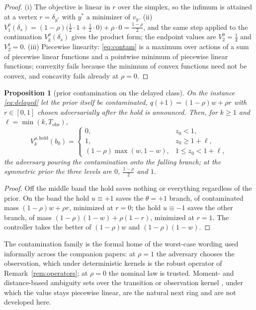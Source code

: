 \documentclass[11pt,a4paper]{article}
\theoremstyle{plain}
\newtheorem{proposition}[theorem]{Proposition}
\theoremstyle{definition}
\theoremstyle{remark}
\newcommand{\hold}{\mathrm{hold}}
\newcommand{\Tobs}{T_{\mathrm{obs}}}
\newcommand{\tfr}[2]{\tfrac{#1}{#2}}
\begin{document}
\begin{proof}
(i) The objective is linear in $r$ over the simplex, so the infimum is attained at a vertex $r=\delta_{y^{*}}$ with $y^{*}$ a minimizer of $v_y$. (ii) $V^{\rho}_1(\delta_s)=(1-\rho)\bigl(\tfr12\cdot1+\tfr12\cdot0\bigr)+\rho\cdot0=\tfr{1-\rho}2$, and the same step applied to the continuation $V^{\rho}_{k}(\delta_s)$ gives the product form; the endpoint values are $V^{0}_2=\tfr14$ and $V^{1}_2=0$. (iii) Piecewise linearity: \eqref{eq:contam} is a maximum over actions of a sum of piecewise linear functions and a pointwise minimum of piecewise linear functions; convexity fails because the minimum of convex functions need not be convex, and concavity fails already at $\rho=0$.
\end{proof}

\begin{proposition}[prior contamination on the delayed class]\label{prop:priorcontam}
On the instance \eqref{eq:delayed} let the prior itself be contaminated, $q(+1)=(1-\rho)w+\rho r$ with $r\in[0,1]$ chosen adversarially after the hold is announced. Then, for $k\ge1$ and $\ell=\min(k,\Tobs)$,
\begin{equation}\label{eq:priorcontam}
V^{\rho,\hold}_k(b_0)=\begin{cases}0,&z_0<1,\\ 1,&z_0\ge1+\ell,\\ (1-\rho)\max(w,1-w),&1\le z_0<1+\ell,\end{cases}
\end{equation}
the adversary pouring the contamination onto the falling branch; at the symmetric prior the three levels are $0$, $\tfr{1-\rho}2$ and $1$.
\end{proposition}

\begin{proof}
Off the middle band the hold saves nothing or everything regardless of the prior. On the band the hold $u\equiv+1$ saves the $\theta=+1$ branch, of contaminated mass $(1-\rho)w+\rho r$, minimized at $r=0$; the hold $u\equiv-1$ saves the other branch, of mass $(1-\rho)(1-w)+\rho(1-r)$, minimized at $r=1$. The controller takes the better of $(1-\rho)w$ and $(1-\rho)(1-w)$.
\end{proof}

The contamination family is the formal home of the worst-case wording used informally across the companion papers: at $\rho=1$ the adversary chooses the observation, which under deterministic kernels is the robust operator of Remark~\ref{rem:operators}; at $\rho=0$ the nominal law is trusted. Moment- and distance-based ambiguity sets over the transition or observation kernel \cite{Osogami2015,Nakao2021,Saghafian2018}, under which the value stays piecewise linear, are the natural next ring and are not developed here.
\end{document}
